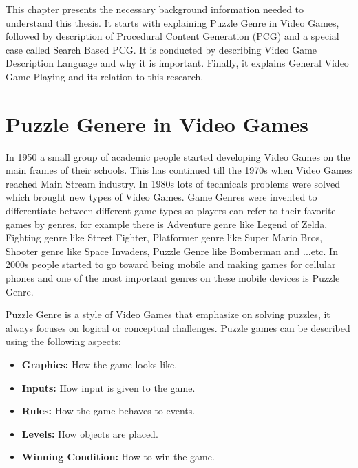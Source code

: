 This chapter presents the necessary background information needed to understand this thesis. It starts with explaining Puzzle Genre in Video Games, followed by description of Procedural Content Generation (PCG) and a special case called Search Based PCG. It is conducted by describing Video Game Description Language and why it is important. Finally, it explains General Video Game Playing and its relation to this research.

\section{Puzzle Genere in Video Games}
In 1950 a small group of academic people started developing Video Games on the main frames of their schools. This has continued till the 1970s when Video Games reached Main Stream industry. In 1980s lots of technicals problems were solved which brought new types of Video Games. Game Genres were invented to differentiate between different game types so players can refer to their favorite games by genres, for example there is Adventure genre like Legend of Zelda, Fighting genre like Street Fighter, Platformer genre like Super Mario Bros, Shooter genre like Space Invaders, Puzzle Genre like Bomberman and ...etc. In 2000s people started to go toward being mobile and making games for cellular  phones and one of the most important genres on these mobile devices is Puzzle Genre\cite{pcgHistory}.\\\par

Puzzle Genre is a style of Video Games that emphasize on solving puzzles, it always focuses on logical or conceptual challenges. Puzzle games can be described using the following aspects:
\begin{itemize} \itemsep0pt \parskip0pt 
	\item \textbf{Graphics:} How the game looks like.
  	\item \textbf{Inputs:} How input is given to the game.
  	\item \textbf{Rules:} How the game behaves to events.
  	\item \textbf{Levels:} How objects are placed.
  	\item \textbf{Winning Condition:} How to win the game.
\end{itemize}

